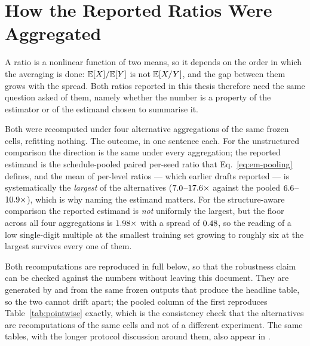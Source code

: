 %

\chapter{How the Reported Ratios Were Aggregated}\label{app:aggregation-chapter}
\label{app:aggregation}

A ratio is a nonlinear function of two means, so it depends on the order in
which the averaging is done: $\mathbb{E}[X]/\mathbb{E}[Y]$ is not $\mathbb{E}[X/Y]$, and the gap
between them grows with the spread. Both ratios reported in this thesis
therefore need the same question asked of them, namely whether the number is a
property of the estimator or of the estimand chosen to summarise it.

Both were recomputed under four alternative aggregations of the same frozen
cells, refitting nothing. The outcome, in one sentence each. For the
unstructured comparison the direction is the same under every aggregation; the
reported estimand is the schedule-pooled paired per-seed ratio that
Eq.~\eqref{eq:em-pooling} defines, and the mean of per-level ratios --- which
earlier drafts reported --- is systematically the \emph{largest} of the
alternatives ($7.0$--$17.6\times$ against the pooled
$6.6$--$10.9\times$), which is why naming the estimand matters. For
the
structure-aware comparison the reported estimand is \emph{not} uniformly the
largest, but the floor across all four aggregations is
$1.98\times$ with a spread of $0.48$, so the reading of
a low single-digit multiple at the smallest training set growing to roughly six
at the largest survives every one of them.

Both recomputations are reproduced in full below, so that the robustness
claim can be checked against the numbers without leaving this document. They
are generated by
 and
 from the same frozen outputs
that produce the headline table, so the two cannot drift apart; the pooled
column of the first reproduces Table~\ref{tab:pointwise} exactly, which is the
consistency check that the alternatives are recomputations of the same cells
and not of a different experiment. The same tables, with the longer protocol
discussion around them, also appear in \compendium{}.

